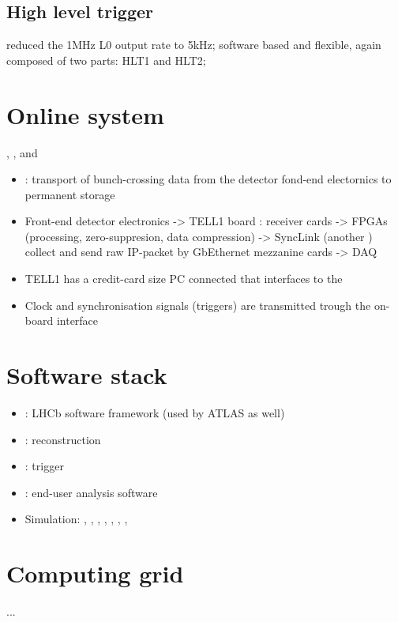 \subsection{High level trigger}
reduced the 1MHz L0 output rate to 5kHz; software based and flexible, again composed of two parts: HLT1 and HLT2; 
\section{Online system}
\DAQ, \TFC, and \ECS
\begin{itemize}
  \item \DAQ: transport of bunch-crossing data from the detector fond-end electornics to permanent storage
  \item Front-end detector electronics -> TELL1 board : receiver cards -> \acp{FPGA} (processing, zero-suppresion, data compression) -> SyncLink (another \FPGA) collect and send raw IP-packet by GbEthernet mezzanine cards -> DAQ
  \item TELL1 has a credit-card size PC connected that interfaces to the \ECS
  \item Clock and synchronisation signals (\eg triggers) are transmitted trough the on-board \TTC interface
\end{itemize}

\section{Software stack}
\begin{itemize}
  \item \Gaudi: LHCb software framework (used by ATLAS as well)
  \item \Brunel: reconstruction
  \item \Brunel: trigger
  \item \DaVinci: end-user analysis software
  \item Simulation: \Gauss, \Boole, \Pythia, \EvtGen, \Photos, \Herwigpp, \Sherpa, \GeantFour
\end{itemize}
\section{Computing grid}
...